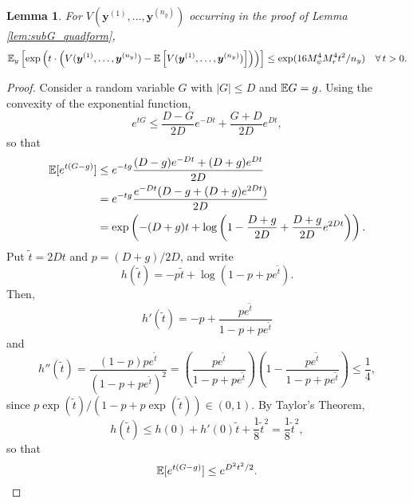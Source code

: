 \documentclass[11pt]{article}
\numberwithin{equation}{section}
\numberwithin{theorem}{section}
\def\faty{\boldsymbol{y}}
\newtheorem{lem}{Lemma}[section]
\theoremstyle{definition}
\theoremstyle{remark}
\begin{document}
\begin{lem} \label{lem:subGV}
For $V(\faty^{(1)},\dots,\faty^{(n_y)})$ occurring in the proof of Lemma \ref{lem:subG_quadform},
\begin{equation}
\EE_y \left[ \exp\left( t\cdot\left(V(\faty^{(1)},\dots,\faty^{(n_y)})-\EE\left[ V(\faty^{(1)},\dots,\faty^{(n_y)}) \right] \right) \right) \right]
\leq \exp(16 M_\psi^4 M_r^4 t^2 / n_y) \quad \forall \, t > 0.
\end{equation}
\end{lem}

\begin{proof}
Consider a random variable $G$ with $|G|\leq D$ and $\mathbb{E} G=g$.
Using the convexity of the exponential function,
\begin{equation}
e^{tG} \leq \frac{D-G}{2D} e^{-Dt} + \frac{G+D}{2D} e^{Dt},
\end{equation}
so that
\begin{equation}
\begin{aligned}
\mathbb{E}[ e^{t(G-g)} ]
&\leq e^{-tg} \frac{(D-g) e^{-Dt} + (D+g) e^{Dt}}{2D} \\
&= e^{-tg} \frac{e^{-Dt} (D - g + (D + g) e^{2Dt})}{2D} \\
&=\exp\left( -(D+g) t + \log\left( 1 - \frac{D+g}{2D} + \frac{D+g}{2D} e^{2Dt} \right) \right).
\end{aligned}
\end{equation}
Put $\tilde t = 2Dt$ and $p = (D+g) / 2D$, and write
\begin{equation}
h(\tilde t) = -p \tilde t + \log(1 - p + pe^{\tilde t}).
\end{equation}
Then,
\begin{equation}
h'(\tilde t) = -p + \frac{p e^{\tilde t}}{1 - p + p e^{\tilde t}}
\end{equation}
and
\begin{equation}
h''(\tilde t)
= \frac{(1-p) p e^{\tilde t}}{(1 - p + p e^{\tilde t})^2}
= \left( \frac{p e^{\tilde t}}{1 - p + p e^{\tilde t}} \right) \left( 1 - \frac{p e^{\tilde t}}{1 - p + p e^{\tilde t}} \right)
\leq \frac{1}{4},
\end{equation}
since $p \exp(\tilde t) / (1 - p + p \exp(\tilde t)) \in (0,1)$.
By Taylor's Theorem,
\begin{equation}
h(\tilde t) \leq h(0) + h'(0) \tilde t + \frac{1}{8} \tilde t^2 = \frac{1}{8} \tilde t^2,
\end{equation}
so that
\begin{equation} \label{ineq:mgf_bdd_rv}
\EE[e^{t(G-g)}] \leq e^{D^2t^2/2}.

\end{equation}
\end{proof}
\end{document}
